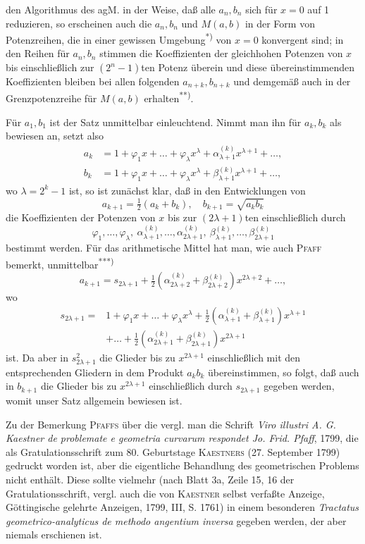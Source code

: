 \noindent den Algorithmus des agM. in der Weise, daß alle $a_n,b_n$ sich für $x=0$ auf 1 reduzieren, so erscheinen auch die $a_n,b_n$ und $M(a,b)$ in der Form von Potenzreihen, die in einer gewissen Umgebung\textsuperscript{*)} von $x=0$ konvergent sind; in den Reihen für $a_n,b_n$ stimmen die Koeffizienten der gleichhohen Potenzen von $x$ bis einschließlich zur $(2^n-1)$ten Potenz überein und diese übereinstimmenden Koeffizienten bleiben bei allen folgenden $a_{n+k},b_{n+k}$ und demgemäß auch in der Grenzpotenzreihe für $M(a,b)$ erhalten\textsuperscript{**)}.
\par\indent Für $a_1,b_1$ ist der Satz unmittelbar einleuchtend. Nimmt man ihn für $a_k,b_k$ als bewiesen an, setzt also
\[\begin{aligned}
a_k&=1+\varphi_1x+\ldots+\varphi_\lambda x^\lambda+\alpha^{(k)}_{\lambda+1}x^{\lambda+1}+\ldots,\\
b_k&=1+\varphi_1x+\ldots+\varphi_\lambda x^\lambda+\beta^{(k)}_{\lambda+1}x^{\lambda+1}+\ldots,
\end{aligned}\]
\noindent wo $\lambda=2^k-1$ ist, so ist zunächst klar, daß in den Entwicklungen von
\[a_{k+1}=\tfrac12(a_k+b_k),\quad b_{k+1}=\sqrt{a_kb_k}\]
\noindent die Koeffizienten der Potenzen von $x$ bis zur $(2\lambda+1)$ten einschließlich durch
\[\varphi_1,\ldots,\varphi_\lambda,\ \alpha^{(k)}_{\lambda+1},\ldots,\alpha^{(k)}_{2\lambda+1},\ \beta^{(k)}_{\lambda+1},\ldots,\beta^{(k)}_{2\lambda+1}\]
\noindent bestimmt werden. Für das arithmetische Mittel hat man, wie auch \textsc{Pfaff} bemerkt, unmittelbar\textsuperscript{***)}
\[a_{k+1}=s_{2\lambda+1}+\tfrac12(\alpha^{(k)}_{2\lambda+2}+\beta^{(k)}_{2\lambda+2})x^{2\lambda+2}+\ldots,\]
\noindent wo
\[\begin{aligned}
s_{2\lambda+1}={}&1+\varphi_1x+\ldots+\varphi_\lambda x^\lambda+\tfrac12(\alpha^{(k)}_{\lambda+1}+\beta^{(k)}_{\lambda+1})x^{\lambda+1}\\
&+\ldots+\tfrac12(\alpha^{(k)}_{2\lambda+1}+\beta^{(k)}_{2\lambda+1})x^{2\lambda+1}
\end{aligned}\]
\noindent ist. Da aber in $s^2_{2\lambda+1}$ die Glieder bis zu $x^{2\lambda+1}$ einschließlich mit den entsprechenden Gliedern in dem Produkt $a_kb_k$ übereinstimmen, so folgt, daß auch in $b_{k+1}$ die Glieder bis zu $x^{2\lambda+1}$ einschließlich durch $s_{2\lambda+1}$ gegeben werden, womit unser Satz allgemein bewiesen ist.
\par\indent Zu der Bemerkung \textsc{Pfaffs} über die  vergl. man die Schrift \textit{Viro illustri A. G. Kaestner de problemate e geometria curvarum respondet Jo. Frid. Pfaff}, 1799, die als Gratulationsschrift zum 80. Geburtstage \textsc{Kaestners} (27. September 1799) gedruckt worden ist, aber die eigentliche Behandlung des geometrischen Problems nicht enthält. Diese sollte vielmehr (nach Blatt 3a, Zeile 15, 16 der Gratulationsschrift, vergl. auch die von \textsc{Kaestner} selbst verfaßte Anzeige, Göttingische gelehrte Anzeigen, 1799, III, S. 1761) in einem besonderen \textit{Tractatus geometrico-analyticus de methodo angentium inversa} gegeben werden, der aber niemals erschienen ist.

